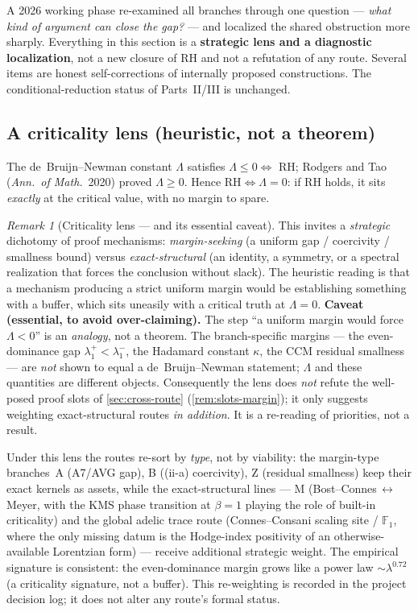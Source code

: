 \documentclass[12pt,a4paper]{article}
\theoremstyle{definition}
\theoremstyle{remark}
\newtheorem{remark}[theorem]{Remark}
\begin{document}
A 2026 working phase re-examined all branches through one question --- \emph{what
kind of argument can close the gap?} --- and localized the shared obstruction more
sharply. Everything in this section is a \textbf{strategic lens and a diagnostic
localization}, not a new closure of RH and not a refutation of any route. Several
items are honest self-corrections of internally proposed constructions. The
conditional-reduction status of Parts~II/III is unchanged.

\subsection{A criticality lens (heuristic, not a theorem)}
\label{sec:lambda-lens}

The de~Bruijn--Newman constant $\Lambda$ satisfies $\Lambda\le 0\Leftrightarrow$ RH;
Rodgers and Tao (\emph{Ann.\ of Math.}\ 2020) proved $\Lambda\ge 0$. Hence
$\mathrm{RH}\Leftrightarrow\Lambda=0$: if RH holds, it sits \emph{exactly} at the
critical value, with no margin to spare.

\begin{remark}[Criticality lens --- and its essential caveat]
\label{rem:lambda-caveat}
This invites a \emph{strategic} dichotomy of proof mechanisms:
\emph{margin-seeking} (a uniform gap / coercivity / smallness bound) versus
\emph{exact-structural} (an identity, a symmetry, or a spectral realization that
forces the conclusion without slack). The heuristic reading is that a mechanism
producing a strict uniform margin would be establishing something with a buffer,
which sits uneasily with a critical truth at $\Lambda=0$.
\textbf{Caveat (essential, to avoid over-claiming).} The step ``a uniform margin
would force $\Lambda<0$'' is an \emph{analogy}, not a theorem. The branch-specific
margins --- the even-dominance gap $\lambda_1^+<\lambda_1^-$, the Hadamard constant
$\kappa$, the CCM residual smallness --- are \emph{not} shown to equal a
de~Bruijn--Newman statement; $\Lambda$ and these quantities are different objects.
Consequently the lens does \emph{not} refute the well-posed proof slots of
\cref{sec:cross-route} (\cref{rem:slots-margin}); it only suggests weighting
exact-structural routes \emph{in addition}. It is a re-reading of priorities, not
a result.
\end{remark}

Under this lens the routes re-sort by \emph{type}, not by viability: the
margin-type branches~A (A7/AVG gap), B ((ii-a) coercivity), Z (residual
smallness) keep their exact kernels as assets, while the exact-structural lines
--- M (Bost--Connes\,$\leftrightarrow$\,Meyer, with the KMS phase transition at
$\beta=1$ playing the role of built-in criticality) and the global adelic trace
route (Connes--Consani scaling site / $\mathbb{F}_1$, where the only missing datum
is the Hodge-index positivity of an otherwise-available Lorentzian form) ---
receive additional strategic weight. The empirical signature is consistent: the
even-dominance margin grows like a power law $\sim\lambda^{0.72}$ (a criticality
signature, not a buffer). This re-weighting is recorded in the project decision
log; it does not alter any route's formal status.
\end{document}
